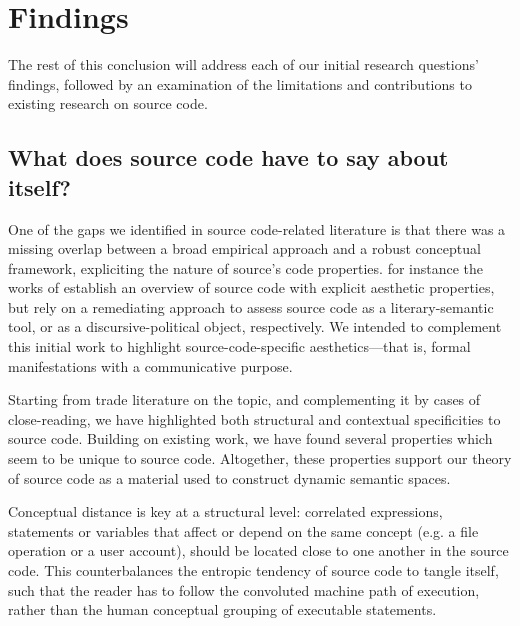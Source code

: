 \section{Findings}
\label{sec:findings}

The rest of this conclusion will address each of our initial research questions' findings, followed by an examination of the limitations and contributions to existing research on source code.

\subsection{What does source code have to say about itself?}
\label{subsec:conclusion-rq-1}

One of the gaps we identified in source code-related literature is that there was a missing overlap between a broad empirical approach and a robust conceptual framework, expliciting the nature of source's code properties. for instance the works of \citep{paloque-berges_poetique_2009,cox_speaking_2013} establish an overview of source code with explicit aesthetic properties, but rely on a remediating approach to assess source code as a literary-semantic tool, or as a discursive-political object, respectively. We intended to complement this initial work to highlight source-code-specific aesthetics—that is, formal manifestations with a communicative purpose.

Starting from trade literature on the topic, and complementing it by cases of close-reading, we have highlighted both structural and contextual specificities to source code. Building on existing work, we have found several properties which seem to be unique to source code. Altogether, these properties support our theory of source code as a material used to construct dynamic semantic spaces.

Conceptual distance is key at a structural level: correlated expressions, statements or variables that affect or depend on the same concept (e.g. a file operation or a user account), should be located close to one another in the source code. This counterbalances the entropic tendency of source code to tangle itself, such that the reader has to follow the convoluted machine path of execution, rather than the human conceptual grouping of executable statements.


